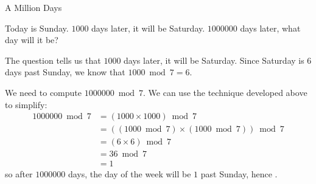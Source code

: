 \documentclass[a4paper,10pt]{report}
\begin{document}
\begin{problem}{A Million Days}

 Today is Sunday. \(1000\) days later, it will be Saturday. \(1000000\) days
 later, what day will it be?

 \begin{solution}

  The question tells us that \(1000\) days later, it will be Saturday. Since
  Saturday is \(6\) days past Sunday, we know that \(1000 \bmod 7 = 6\).

  We need to compute \(1000000 \bmod 7\). We can use the technique developed
  above to simplify: \begin{align*}
   1000000 \bmod 7
   &= (1000 \times 1000) \bmod 7 \\
   &= ((1000 \bmod 7) \times (1000 \bmod 7)) \bmod 7 \\
   &= (6 \times 6) \bmod 7 \\
   &= 36 \bmod 7 \\
   &= 1
  \end{align*}
  so after \(1000000\) days, the day of the week will be \(1\) past Sunday,
  hence .

 \end{solution}
\end{problem}
\end{document}
